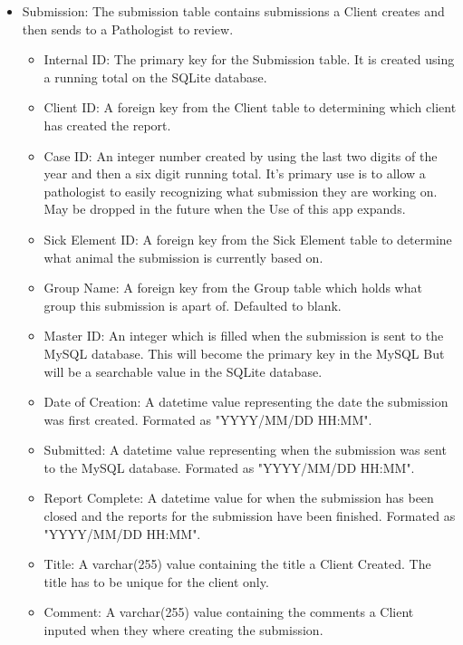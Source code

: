 \documentclass[onecolumn, draftclsnofoot,10pt, compsoc]{IEEEtran}
\begin{document}
\begin{itemize}
\item Submission:\newline
The submission table contains submissions a Client creates and then sends to a Pathologist to review.
\begin{itemize}
\item Internal ID: The primary key for the Submission table. It is created using a running total on the SQLite database.
\item Client ID: A foreign key from the Client table to determining which client has created the report.
\item Case ID: An integer number created by using the last two digits of the year and then a six digit running total. It's primary use is to allow a pathologist to easily recognizing what submission they are working on. May be dropped in the future when the Use of this app expands.
\item Sick Element ID: A foreign key from the Sick Element table to determine what animal the submission is currently based on.
\item Group Name: A foreign key from the Group table which holds what group this submission is apart of. Defaulted to blank.
\item Master ID: An integer which is filled when the submission is sent to the MySQL database. This will become the primary key in the MySQL But will be a searchable value in the SQLite database.
\item Date of Creation: A datetime value representing the date the submission was first created. Formated as "YYYY/MM/DD HH:MM".
\item Submitted: A datetime value representing when the submission was sent to the MySQL database. Formated as "YYYY/MM/DD HH:MM".
\item Report Complete: A datetime value for when the submission has been closed and the reports for the submission have been finished. Formated as "YYYY/MM/DD HH:MM".
\item Title: A varchar(255) value containing the title a Client Created. The title has to be unique for the client only.
\item Comment: A varchar(255) value containing the comments a Client inputed when they where creating the submission.
\end{itemize}


\end{itemize}
\end{document}
